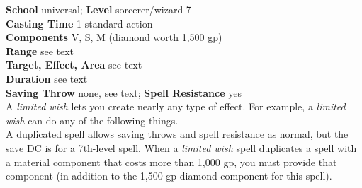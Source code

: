 \textbf{School }universal; \textbf{Level }sorcerer/wizard 7\\
\textbf{Casting Time }1 standard action\\
\textbf{Components }V, S, M (diamond worth 1,500 gp)\\
\textbf{Range }see text\\
\textbf{Target, Effect, Area }see text\\
\textbf{Duration }see text\\
\textbf{Saving Throw} none, see text; \textbf{Spell Resistance} yes\\
A \textit{limited wish }lets you create nearly any type of effect. For example, a \textit{limited wish }can do any of the following things.\\
A duplicated spell allows saving throws and spell resistance as normal, but the save DC is for a 7th-level spell. When a \textit{limited wish }spell duplicates a spell with a material component that costs more than 1,000 gp, you must provide that component (in addition to the 1,500 gp diamond component for this spell).\\
